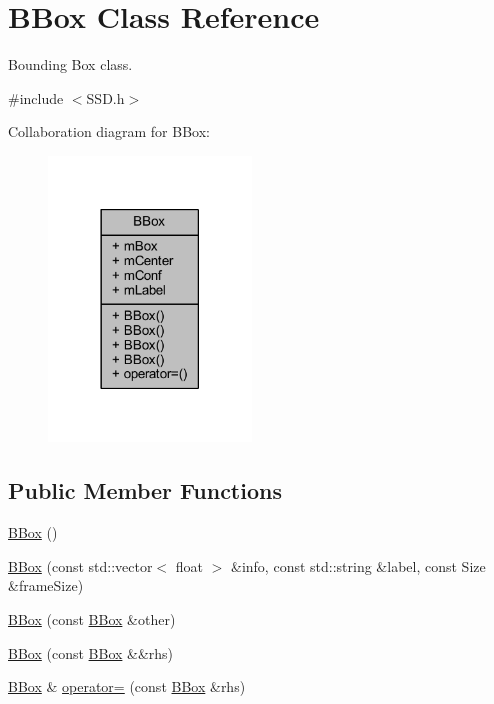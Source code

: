 \hypertarget{class_b_box}{}\section{B\+Box Class Reference}
\label{class_b_box}


Bounding Box class.  




{\ttfamily \#include $<$S\+S\+D.\+h$>$}



Collaboration diagram for B\+Box\+:\nopagebreak
\begin{figure}[H]
\begin{center}
\leavevmode
\includegraphics[width=153pt]{class_b_box__coll__graph}
\end{center}
\end{figure}
\subsection*{Public Member Functions}
\begin{DoxyCompactItemize}
\item 
\mbox{\hyperlink{class_b_box_ae26e694ee88779b928e8d3726f8213a1}{B\+Box}} ()
\item 
\mbox{\hyperlink{class_b_box_abf992411e47d4e0724b658c7d5b859f5}{B\+Box}} (const std\+::vector$<$ float $>$ \&info, const std\+::string \&label, const Size \&frame\+Size)
\item 
\mbox{\hyperlink{class_b_box_a688936f49a66994f465852fb80373766}{B\+Box}} (const \mbox{\hyperlink{class_b_box}{B\+Box}} \&other)
\item 
\mbox{\hyperlink{class_b_box_a0b083839aa620260f77f87bfc307a74a}{B\+Box}} (const \mbox{\hyperlink{class_b_box}{B\+Box}} \&\&rhs)
\item 
\mbox{\hyperlink{class_b_box}{B\+Box}} \& \mbox{\hyperlink{class_b_box_ac902995103b05e2e5a2e6d58883a85e5}{operator=}} (const \mbox{\hyperlink{class_b_box}{B\+Box}} \&rhs)
\end{DoxyCompactItemize}
